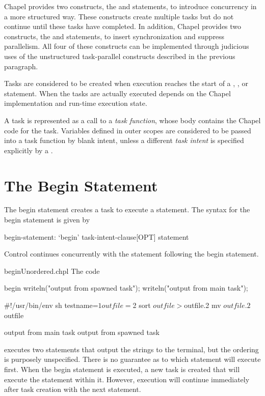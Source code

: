 Chapel provides two constructs, the  and  statements,
to introduce concurrency in a more structured way.  These constructs
create multiple tasks but do not continue until these tasks have
completed.  In addition, Chapel provides two constructs, the  and
 statements, to insert synchronization and suppress parallelism.
All four of these constructs can be implemented through judicious uses
of the unstructured task-parallel constructs described in the previous
paragraph.

Tasks are considered to be created when execution reaches the start
of a , , or  statement.
When the tasks are actually executed depends on the Chapel
implementation and run-time execution state.

A task is represented as a call to a \emph{task function}, whose body
contains the Chapel code for the task. Variables defined in outer
scopes are considered to be passed into a task function by blank intent,
unless a different \emph{task intent} is specified explicitly
by a .


\section{The Begin Statement}
\label{Begin}

The begin statement creates a task to execute a statement.  The syntax
for the begin statement is given by
\begin{syntax}
begin-statement:
  `begin' task-intent-clause[OPT] statement
\end{syntax}
Control continues concurrently with the statement following the
begin statement.

\begin{chapelexample}{beginUnordered.chpl}
The code
\begin{chapel}
begin writeln("output from spawned task");
writeln("output from main task");
\end{chapel}
\begin{chapelprediff}
\#!/usr/bin/env sh
testname=$1
outfile=$2
sort $outfile > $outfile.2
mv $outfile.2 $outfile
\end{chapelprediff}
\begin{chapeloutput}
output from main task
output from spawned task
\end{chapeloutput}
executes two  statements that output the strings to the
terminal, but the ordering is purposely unspecified.  There is no
guarantee as to which statement will execute first.  When the
begin statement is executed, a new task is created that will execute
the  statement within it.  However, execution will
continue immediately after task creation with the next statement.
\end{chapelexample}

